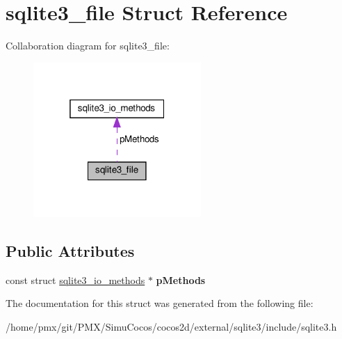 \hypertarget{structsqlite3__file}{}\section{sqlite3\+\_\+file Struct Reference}
\label{structsqlite3__file}


Collaboration diagram for sqlite3\+\_\+file\+:
\nopagebreak
\begin{figure}[H]
\begin{center}
\leavevmode
\includegraphics[width=181pt]{structsqlite3__file__coll__graph}
\end{center}
\end{figure}
\subsection*{Public Attributes}
\begin{DoxyCompactItemize}
\item 
\mbox{\label{structsqlite3__file_afbe27b40382393e63784a4d4b43f3ad7}} 
const struct \hyperlink{structsqlite3__io__methods}{sqlite3\+\_\+io\+\_\+methods} $\ast$ {\bfseries p\+Methods}
\end{DoxyCompactItemize}


The documentation for this struct was generated from the following file\+:\begin{DoxyCompactItemize}
\item 
/home/pmx/git/\+P\+M\+X/\+Simu\+Cocos/cocos2d/external/sqlite3/include/sqlite3.\+h\end{DoxyCompactItemize}
